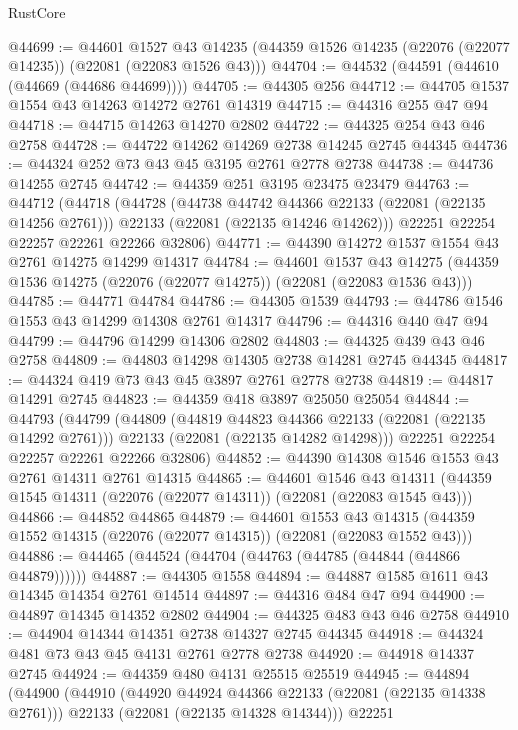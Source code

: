 \begin{lexlean}{RustCore}
\begin{coremodule}
@44699 := @44601
    @1527
    @43
    @14235
    (@44359 @1526 @14235 (@22076 (@22077 @14235)) (@22081 (@22083 @1526 @43)))
@44704 := @44532 (@44591 (@44610 (@44669 (@44686 @44699))))
@44705 := @44305 @256
@44712 := @44705 @1537 @1554 @43 @14263 @14272 @2761 @14319
@44715 := @44316 @255 @47 @94
@44718 := @44715 @14263 @14270 @2802
@44722 := @44325 @254 @43 @46 @2758
@44728 := @44722 @14262 @14269 @2738 @14245 @2745 @44345
@44736 := @44324 @252 @73 @43 @45 @3195 @2761 @2778 @2738
@44738 := @44736 @14255 @2745
@44742 := @44359 @251 @3195 @23475 @23479
@44763 := @44712
    (@44718
      (@44728
        (@44738 @44742 @44366 @22133 (@22081 (@22135 @14256 @2761)))
        @22133
        (@22081 (@22135 @14246 @14262)))
      @22251
      @22254
      @22257
      @22261
      @22266
      @32806)
@44771 := @44390 @14272 @1537 @1554 @43 @2761 @14275 @14299 @14317
@44784 := @44601
    @1537
    @43
    @14275
    (@44359 @1536 @14275 (@22076 (@22077 @14275)) (@22081 (@22083 @1536 @43)))
@44785 := @44771 @44784
@44786 := @44305 @1539
@44793 := @44786 @1546 @1553 @43 @14299 @14308 @2761 @14317
@44796 := @44316 @440 @47 @94
@44799 := @44796 @14299 @14306 @2802
@44803 := @44325 @439 @43 @46 @2758
@44809 := @44803 @14298 @14305 @2738 @14281 @2745 @44345
@44817 := @44324 @419 @73 @43 @45 @3897 @2761 @2778 @2738
@44819 := @44817 @14291 @2745
@44823 := @44359 @418 @3897 @25050 @25054
@44844 := @44793
    (@44799
      (@44809
        (@44819 @44823 @44366 @22133 (@22081 (@22135 @14292 @2761)))
        @22133
        (@22081 (@22135 @14282 @14298)))
      @22251
      @22254
      @22257
      @22261
      @22266
      @32806)
@44852 := @44390 @14308 @1546 @1553 @43 @2761 @14311 @2761 @14315
@44865 := @44601
    @1546
    @43
    @14311
    (@44359 @1545 @14311 (@22076 (@22077 @14311)) (@22081 (@22083 @1545 @43)))
@44866 := @44852 @44865
@44879 := @44601
    @1553
    @43
    @14315
    (@44359 @1552 @14315 (@22076 (@22077 @14315)) (@22081 (@22083 @1552 @43)))
@44886 := @44465 (@44524 (@44704 (@44763 (@44785 (@44844 (@44866 @44879))))))
@44887 := @44305 @1558
@44894 := @44887 @1585 @1611 @43 @14345 @14354 @2761 @14514
@44897 := @44316 @484 @47 @94
@44900 := @44897 @14345 @14352 @2802
@44904 := @44325 @483 @43 @46 @2758
@44910 := @44904 @14344 @14351 @2738 @14327 @2745 @44345
@44918 := @44324 @481 @73 @43 @45 @4131 @2761 @2778 @2738
@44920 := @44918 @14337 @2745
@44924 := @44359 @480 @4131 @25515 @25519
@44945 := @44894
    (@44900
      (@44910
        (@44920 @44924 @44366 @22133 (@22081 (@22135 @14338 @2761)))
        @22133
        (@22081 (@22135 @14328 @14344)))
      @22251

\end{coremodule}
\end{lexlean}
